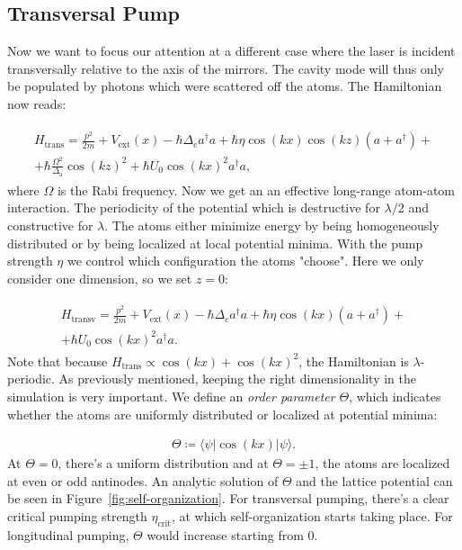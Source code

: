 \subsection{Transversal Pump}

Now we want to focus our attention at a different case where the laser is incident transversally relative to the axis of the mirrors. The cavity mode will thus only be populated by photons which were scattered off the atoms. The Hamiltonian now reads:

\begin{align}
\begin{split}
H_\text{trans} = \frac{p^2}{2m} + V_\text{ext}(x) - \hbar \Delta_\text{c} a^\dagger a  + \hbar \eta \cos(kx) \cos(kz) (a + a^\dagger) + \\
+ \hbar \frac{\Omega^2}{\Delta_\text{a}} \cos(kz)^2 + \hbar U_0 \cos(kx)^2 a^\dagger a,
\end{split}
\end{align}where $\Omega$ is the Rabi frequency. Now we get an an effective long-range atom-atom interaction. The periodicity of the potential which is destructive for $\lambda / 2$ and constructive for $\lambda$. The atoms either minimize energy by being homogeneously distributed or by being localized at local potential minima. With the pump strength $\eta$ we control which configuration the atoms "choose". Here we only consider one dimension, so we set $z=0$:

\begin{align}
\begin{split}
H_\text{transv} = \frac{p^2}{2m} + V_\text{ext}(x) - \hbar \Delta_c a^\dagger a + \hbar \eta \cos(kx) (a + a^\dagger) + \\
 + \hbar U_0 \cos(kx)^2 a^\dagger a.
\end{split}
\end{align}Note that because $H_\text{trans} \propto \cos(kx) + \cos(kx)^2$, the Hamiltonian is $\lambda$-periodic. As previously mentioned, keeping the right dimensionality in the simulation is very important. We define an \textit{order parameter} $\Theta$, which indicates whether the atoms are uniformly distributed or localized at potential minima:

\begin{align}
\Theta \coloneqq \langle \psi | \cos(kx) | \psi \rangle.
\end{align}At $\Theta = 0$, there's a uniform distribution and at $\Theta = \pm 1$, the atoms are localized at even or odd antinodes. An analytic solution of $\Theta$ and the lattice potential can be seen in Figure~\ref{fig:self-organization}. For transversal pumping, there's a clear critical pumping strength $\eta_\text{crit}$, at which self-organization starts taking place. For longitudinal pumping, $\Theta$ would increase starting from 0.

